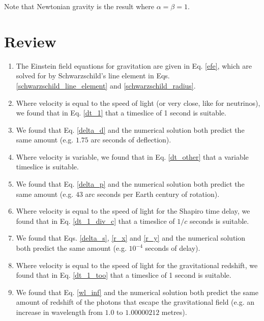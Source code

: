 \documentclass[12pt]{article}
\begin{document}
Note that Newtonian gravity is the result where $\alpha = \beta = 1$.





\section {Review}

\begin{enumerate}

\item
The Einstein field equations for gravitation are given in Eq. \ref{efe}, which are solved for by Schwarzschild's line element in Eqs. \ref{schwarzschild_line_element} and \ref{schwarzschild_radius}.

\item
Where velocity is equal to the speed of light (or very close, like for neutrinos), we found that in Eq. \ref{dt_1} that a timeslice of 1 second is suitable.

\item
We found that Eq. \ref{delta_d} and the numerical solution both predict the same amount (e.g. $1.75$ arc seconds of deflection).

\item
Where velocity is variable, we found that in Eq. \ref{dt_other} that a variable timeslice is suitable.

\item
We found that Eq. \ref{delta_p} and the numerical solution both predict the same amount (e.g. $43$ arc seconds per Earth century of rotation).

\item
Where velocity is equal to the speed of light for the Shapiro time delay, we found that in Eq. \ref{dt_1_div_c} that a timeslice of $1/c$ seconds is suitable.

\item 
We found that Eqs. \ref{delta_s}, \ref{r_x} and \ref{r_y} and the numerical solution both predict the same amount (e.g. $10^{-4}$ seconds of delay).

\item
Where velocity is equal to the speed of light for the gravitational redshift, we found that in Eq. \ref{dt_1_too} that a timeslice of 1 second is suitable.

\item
We found that Eq. \ref{wl_inf} and the numerical solution both predict the same amount of redshift of the photons that escape the gravitational field (e.g. an increase in wavelength from $1.0$ to $1.00000212$ metres).


\end{enumerate}
\end{document}
